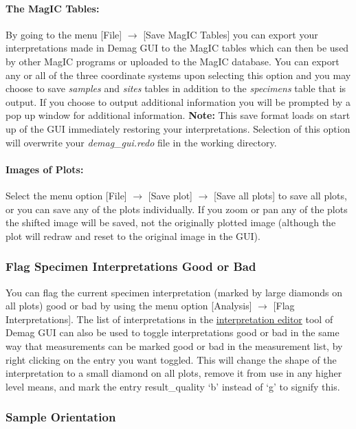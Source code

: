 \documentclass[11pt]{book}
\begin{document}
{{\paragraph{The MagIC Tables:}\label{the-pmag-tables} By going to the menu [File] $\rightarrow$ [Save MagIC Tables] you can export your interpretations made in Demag GUI to the MagIC tables which can then be used by other MagIC programs or uploaded to the MagIC database. You can export any or all of the three coordinate systems upon selecting this option and you may choose to save {\it samples} and {\it sites}  tables in addition to the {\it specimens } table that is output. If you choose to output additional information you will be prompted by a pop up window for additional information. \textbf{Note:} This save format loads on start up of the GUI immediately restoring your interpretations. Selection of this option will overwrite your {\it demag\_gui.redo} file in the working directory.

\paragraph{Images of Plots:}\label{images-of-plots} Select the menu option [File] $\rightarrow$ [Save plot] $\rightarrow$ [Save all plots] to save all plots, or you can save any of the plots individually. If you zoom or pan any of the plots the shifted image will be saved, not the originally plotted image (although the plot will redraw and reset to the original image in the GUI).

\subsubsection{Flag Specimen Interpretations Good or Bad}\label{flag-spec-interps}

You can flag the current specimen interpretation (marked by large diamonds on all plots) good or bad by using the menu option [Analysis] $\rightarrow$ [Flag Interpretations]. The list of interpretations in the \hyperref[interpretation-editor]{interpretation editor} tool of Demag GUI can also be used to toggle interpretations good or bad in the same way that measurements can be marked good or bad in the measurement list, by right clicking on the entry you want toggled. This will change the shape of the interpretation to a small diamond on all plots, remove it from use in any higher level means, and mark the entry result\_quality `b' instead of `g' to signify this.

\subsubsection{Sample Orientation}\label{sample-orient}

}}
\end{document}
